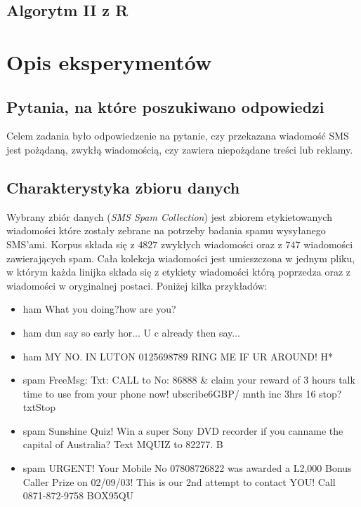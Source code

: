 \documentclass[a4paper,12pt]{article}
\begin{document}
\subsection{Algorytm II z R}

\section{Opis eksperymentów}

\subsection{Pytania, na które poszukiwano odpowiedzi}

Celem zadania było odpowiedzenie na pytanie, czy przekazana wiadomość SMS jest pożądaną, zwykłą wiadomością, czy zawiera niepożądane treści lub reklamy.

\subsection{Charakterystyka zbioru danych}\label{dane:charakterystyka}

Wybrany zbiór danych (\textit{SMS Spam Collection}) jest zbiorem etykietowanych wiadomości które zostały zebrane na potrzeby badania spamu wysyłanego SMS'ami. Korpus składa się z $4827$ zwykłych wiadomości oraz z $747$ wiadomości zawierających spam. Cała kolekcja wiadomości jest umieszczona w jednym pliku, w którym każda linijka składa się z etykiety wiadomości którą poprzedza oraz z wiadomości w oryginalnej postaci. Poniżej kilka przykładów:

\begin{itemize}
	\item ham What you doing?how are you? 
	\item ham dun say so early hor... U c already then say... 
	\item ham MY NO. IN LUTON 0125698789 RING ME IF UR AROUND! H* 
	\item spam FreeMsg: Txt: CALL to No: 86888 \& claim your reward of 3 hours talk time to use from your phone now! ubscribe6GBP/ mnth inc 3hrs 16 stop?txtStop 
	\item spam Sunshine Quiz! Win a super Sony DVD recorder if you canname the capital of Australia? Text MQUIZ to 82277. B 
	\item spam URGENT! Your Mobile No 07808726822 was awarded a L2,000 Bonus Caller Prize on 02/09/03! This is our 2nd attempt to contact YOU! Call 0871-872-9758 BOX95QU 
\end{itemize}
\end{document}
